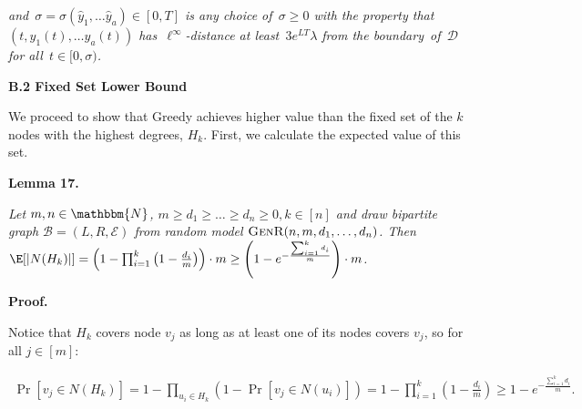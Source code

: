 \documentclass[10pt,a4paper]{article}
\begin{document}
\emph{and $\sigma=\sigma(\hat{y}_{1},\ldots\hat{y}_{a})\in[0,T]$ is any choice of $\sigma\geq 0$ with the property
that $(t,y_{1}(t),\ldots y_{a}(t))$ has $\ell^{\infty}$-distance at least $3e^{LT}\lambda$
from the boundary of $\mathcal{D}$ for all $t\in[0,\sigma)$.}\par








\par\medskip\noindent\textbf{B.2 Fixed Set Lower Bound}\par




We proceed to show that Greedy achieves higher value than the fixed set of the $k$ nodes with the highest degrees, $H_{k}$. First, we calculate the expected value of this set.\par





\par\medskip\noindent\textbf{\textbf{Lemma 17}\textbf{.}}\par



\emph{Let $m,n\in\mathbbm{N}$, $m\geq d_{1}\geq\dots\geq d_{n}\geq 0,k\in[n]$ and draw bipartite graph $\mathcal{B}=(L,R,\mathcal{E})$ from random model $\textsc{GenR}(n,m,d_{1},\dots,d_{n})$.
Then $\E[|N(H_{k})|]=\left(1-\prod_{i=1}^{k}\left(1-\frac{d_{i}}{m}\right)\right)\cdot m\geq\left(1-e^{-\frac{\sum_{i=1}^{k}d_{i}}{m}}\right)\cdot m$.}\par






\par\medskip\noindent\textbf{Proof.}\par



Notice that $H_{k}$ covers node $v_{j}$ as long as at least one of its nodes covers $v_{j}$, so for all $j\in[m]$:\par


\[\begin{gathered}
\displaystyle\Pr\left[v_{j}\in N(H_{k})\right]=1-\prod_{u_{i}\in H_{k}}{\left(1-\Pr\left[v_{j}\in N(u_{i})\right]\right)}=1-\prod_{i=1}^{k}{\left(1-\frac{d_{i}}{m}\right)}\geq 1-e^{-\frac{\sum_{i=1}^{k}d_{i}}{m}}.
\end{gathered}\]
\end{document}
